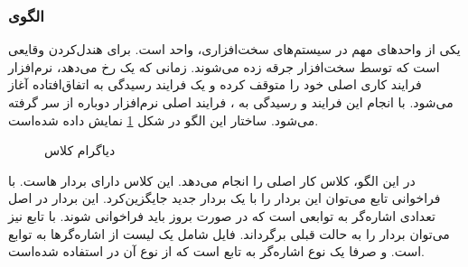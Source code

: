 \subsubsection{الگوی }
\label{HWInterruptSec}
\begin{RTL}
یکی از واحدهای مهم در سیستم‌های سخت‌افزاری، واحد  است.
 برای هندل‌کردن وقایعی است که توسط سخت‌افزار جرقه زده می‌شوند.
زمانی که یک  رخ می‌دهد، نرم‌افزار فرایند کاری اصلی خود را متوقف
کرده و یک فرایند رسیدگی به  اتفاق‌افتاده آغاز می‌شود. با انجام
این فرایند و رسیدگی به ، فرایند اصلی نرم‌افزار دوباره از سر گرفته
می‌شود. ساختار این الگو \cite{ref1} در شکل \ref{HWInterruptClassDiag}
نمایش داده شده‌است.
\end{RTL}
\begin{figure}[h!]
\centering
{}
\caption{دیاگرام کلاس }
\label{HWInterruptClassDiag}
\end{figure}
\begin{RTL}
در این الگو، کلاس  کار اصلی را انجام می‌دهد.
این کلاس دارای بردار هاست.
با فراخوانی تابع  می‌توان این بردار را با یک بردار جدید جایگزین‌کرد.
این بردار در اصل تعدادی اشاره‌گر به توابعی است که در صورت بروز 
باید فراخوانی شوند. با تابع  نیز می‌توان بردار را به حالت قبلی
برگرداند. فایل  شامل یک لیست از
اشاره‌گرها به توابع  است.
و  صرفا یک نوع اشاره‌گر به تابع است که از نوع آن در
 استفاده شده‌است.
\end{RTL}
